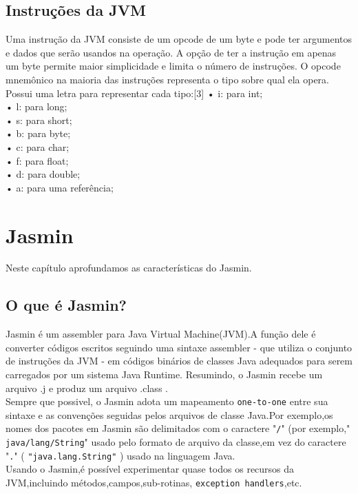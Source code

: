 \documentclass[12pt,a4paper,twoside]{report}
\begin{document}
\section{Instruções da JVM}
Uma instrução da JVM consiste de um opcode de um byte e pode ter argumentos e dados
que serão usandos na operação. A opção de ter a instrução em apenas um byte permite maior
simplicidade e limita o número de instruções.
O opcode mnemônico na maioria das instruções representa o tipo sobre qual ela opera. Possui
uma letra para representar cada tipo:[3]
• i: para int;\\
• l: para long;\\
• s: para short;\\
• b: para byte;\\
• c: para char;\\
• f: para float;\\
• d: para double;\\
• a: para uma referência;
\chapter{Jasmin}
Neste capítulo aprofundamos as características do Jasmin.
\section{O que é Jasmin?}
 Jasmin é um assembler para Java Virtual Machine(JVM).A função dele é converter códigos escritos seguindo uma sintaxe assembler - que utiliza o conjunto de instruções da JVM - em códigos binários de classes Java adequados para serem carregados por um sistema Java Runtime. Resumindo, o Jasmin recebe um arquivo .j e produz um arquivo .class .\\
Sempre que possivel, o Jasmin adota um mapeamento   \texttt{one-to-one} entre sua sintaxe e as convenções seguidas pelos arquivos de classe Java.Por exemplo,os nomes dos pacotes em Jasmin são delimitados com o caractere   "\texttt{/}"  (por exemplo," \texttt{java/lang/String}" usado pelo formato de arquivo da classe,em vez do caractere   "\texttt{.}" (  \texttt{"java.lang.String"} )  usado na linguagem Java.\\ Usando o Jasmin,é possível experimentar quase todos os recursos da JVM,incluindo métodos,campos,sub-rotinas, \texttt{exception handlers},etc.
\end{document}
